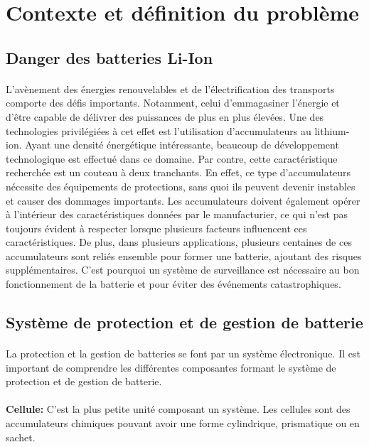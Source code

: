\section{Contexte et définition du problème}

	\subsection{Danger des batteries Li-Ion}
	
		\paragraph{}
		L'avènement des énergies renouvelables et de l'électrification des transports comporte des défis importants. Notamment, celui d'emmagasiner l'énergie et d'être capable de délivrer des puissances de plus en plus élevées. Une des technologies privilégiées à cet effet est l'utilisation d'accumulateurs au lithium-ion. Ayant une densité énergétique intéressante, beaucoup de développement technologique est effectué dans ce domaine. Par contre, cette caractéristique recherchée est un couteau à deux tranchants. En effet, ce type d'accumulateurs nécessite des équipements de protections, sans quoi ils peuvent devenir instables et causer des dommages importants. Les accumulateurs doivent également opérer à l'intérieur des caractéristiques données par le manufacturier, ce qui n'est pas toujours évident à respecter lorsque plusieurs facteurs influencent ces caractéristiques. De plus, dans plusieurs applications, plusieurs centaines de ces accumulateurs sont reliés ensemble pour former une batterie, ajoutant des risques supplémentaires. C'est pourquoi un système de surveillance est nécessaire au bon fonctionnement de la batterie et pour éviter des événements catastrophiques.
	
	\subsection{Système de protection et de gestion de batterie}
	
		\paragraph{}
		La protection et la gestion de batteries se font par un système électronique. Il est important de comprendre les différentes composantes formant le système de protection et de gestion de batterie.
		
		\paragraph{}   \textbf{Cellule:}
		 C'est la plus petite unité composant un système. Les cellules sont des accumulateurs chimiques pouvant avoir une forme cylindrique, prismatique ou en sachet.  
		
